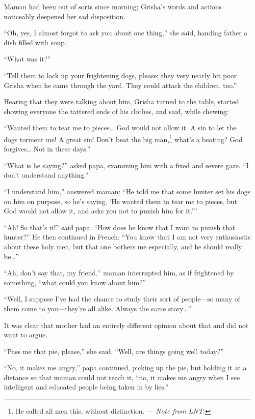 Maman had been out of sorts since morning; Grisha's words and actions noticeably deepened her sad disposition. 

``Oh, yes, I almost forgot to ask you about one thing,'' she said, handing father a dish filled with soup. %

``What was it?'' %

``Tell them to lock up your frightening dogs, please; they very nearly bit poor Grisha when he came through the yard. They could attack the children, too.'' %

Hearing that they were talking about him, Grisha turned to the table, started showing everyone the tattered ends of his clothes, and said, while chewing:

``Wanted them to tear me to pieces\ldots{} God would not allow it. A sin to let the dogs torment me! A great sin! Don't beat the big man,\footnote{He called all men this, without distinction. --- \textit{Note from LNT.}} what's a beating? God forgives\ldots{} Not in these days.'' %

``What is he saying?'' asked papa, examining him with a fixed and severe gaze. ``I don't understand anything.'' %

``I understand him,'' answered maman: ``He told me that some hunter set his dogs on him on purpose, so he's saying, `He wanted them to tear me to pieces, but God would not allow it, and asks you not to punish him for it.''' %

``Ah! So that's it!'' said papa. ``How does he know that I want to punish that hunter?'' He then continued in French: ``You know that I am not very enthusiastic about these holy men, but that one bothers me especially, and he should really be\ldots{}'' %

``Ah, don't say that, my friend,'' maman interrupted him, as if frightened by something, ``what could you know about him?'' %

``Well, I suppose I've had the chance to study their sort of people---so many of them come to you---they're all alike. Always the same story\ldots{}'' %

It was clear that mother had an entirely different opinion about that and did not want to argue.

``Pass me that pie, please,'' she said. ``Well, are things going well today?'' %

``No, it makes me angry,'' papa continued, picking up the pie, but holding it at a distance so that maman could not reach it, ``no, it makes me angry when I see intelligent and educated people being taken in by lies.'' %

